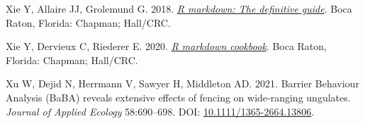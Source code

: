 \documentclass[10pt,a4paper]{article}
\newlength{\cslhangindent}
\newenvironment{CSLReferences}[2] %
 {\begin{list}{}{%
  \setlength{\itemindent}{0pt}
  \setlength{\leftmargin}{0pt}
  \setlength{\parsep}{0pt}
  \ifodd #1
   \setlength{\leftmargin}{\cslhangindent}
   \setlength{\itemindent}{-1\cslhangindent}
  \fi
  \setlength{\itemsep}{#2\baselineskip}}}
 {\end{list}}
\begin{document}
\begin{CSLReferences}{1}{0}
Xie Y, Allaire JJ, Grolemund G. 2018. \emph{\href{https://bookdown.org/yihui/rmarkdown}{R markdown: The definitive guide}}. Boca Raton, Florida: Chapman; Hall/CRC.

Xie Y, Dervieux C, Riederer E. 2020. \emph{\href{https://bookdown.org/yihui/rmarkdown-cookbook}{R markdown cookbook}}. Boca Raton, Florida: Chapman; Hall/CRC.

Xu W, Dejid N, Herrmann V, Sawyer H, Middleton AD. 2021. Barrier {Behaviour} {Analysis} ({BaBA}) reveals extensive effects of fencing on wide‐ranging ungulates. \emph{Journal of Applied Ecology} 58:690--698. DOI: \href{https://doi.org/10.1111/1365-2664.13806}{10.1111/1365-2664.13806}.

\end{CSLReferences}
\end{document}
